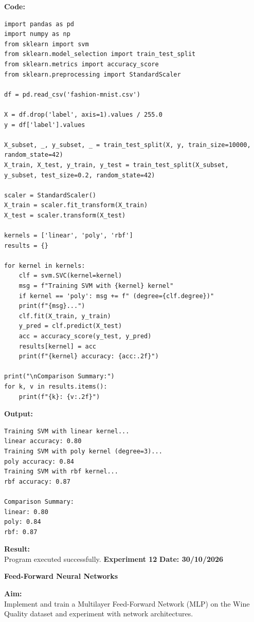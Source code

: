 \documentclass[12pt, a4paper]{article}
\begin{document}
\vspace{\baselineskip}
\noindent \textbf{Code:}\\
\begin{lstlisting}
import pandas as pd
import numpy as np
from sklearn import svm
from sklearn.model_selection import train_test_split
from sklearn.metrics import accuracy_score
from sklearn.preprocessing import StandardScaler

df = pd.read_csv('fashion-mnist.csv')

X = df.drop('label', axis=1).values / 255.0
y = df['label'].values

X_subset, _, y_subset, _ = train_test_split(X, y, train_size=10000, random_state=42)
X_train, X_test, y_train, y_test = train_test_split(X_subset, y_subset, test_size=0.2, random_state=42)

scaler = StandardScaler()
X_train = scaler.fit_transform(X_train)
X_test = scaler.transform(X_test)

kernels = ['linear', 'poly', 'rbf']
results = {}

for kernel in kernels:
    clf = svm.SVC(kernel=kernel)
    msg = f"Training SVM with {kernel} kernel"
    if kernel == 'poly': msg += f" (degree={clf.degree})"
    print(f"{msg}...")
    clf.fit(X_train, y_train)
    y_pred = clf.predict(X_test)
    acc = accuracy_score(y_test, y_pred)
    results[kernel] = acc
    print(f"{kernel} accuracy: {acc:.2f}")

print("\nComparison Summary:")
for k, v in results.items():
    print(f"{k}: {v:.2f}")

\end{lstlisting}

\vspace{\baselineskip}

\noindent \textbf{Output:}\\
\begin{lstlisting}[style=terminal]
Training SVM with linear kernel...
linear accuracy: 0.80
Training SVM with poly kernel (degree=3)...
poly accuracy: 0.84
Training SVM with rbf kernel...
rbf accuracy: 0.87

Comparison Summary:
linear: 0.80
poly: 0.84
rbf: 0.87
\end{lstlisting}

\vspace{\baselineskip}

\noindent \textbf{Result:}\\
Program executed successfully.
\newpage
\noindent \textbf{Experiment 12} \hfill \textbf{Date: 30/10/2026}\\
\begin{center} \Large \textbf{Feed-Forward Neural Networks} \end{center}
\textbf{Aim:}\\
Implement and train a Multilayer Feed-Forward Network (MLP) on the Wine Quality dataset and experiment with network architectures.
\end{document}
